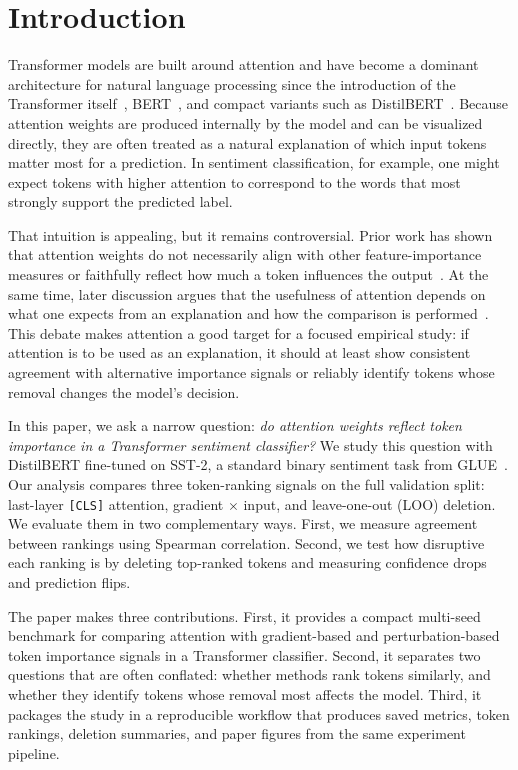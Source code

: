 \section{Introduction}
\label{sec:introduction}

Transformer models are built around attention and have become a dominant architecture for natural language processing since the introduction of the Transformer itself~\cite{vaswani2017attention}, BERT~\cite{devlin2019bert}, and compact variants such as DistilBERT~\cite{sanh2019distilbert}. Because attention weights are produced internally by the model and can be visualized directly, they are often treated as a natural explanation of which input tokens matter most for a prediction. In sentiment classification, for example, one might expect tokens with higher attention to correspond to the words that most strongly support the predicted label.

That intuition is appealing, but it remains controversial. Prior work has shown that attention weights do not necessarily align with other feature-importance measures or faithfully reflect how much a token influences the output~\cite{jain2019attention,serrano2019attention}. At the same time, later discussion argues that the usefulness of attention depends on what one expects from an explanation and how the comparison is performed~\cite{wiegreffe2019attention}. This debate makes attention a good target for a focused empirical study: if attention is to be used as an explanation, it should at least show consistent agreement with alternative importance signals or reliably identify tokens whose removal changes the model's decision.

In this paper, we ask a narrow question: \emph{do attention weights reflect token importance in a Transformer sentiment classifier?} We study this question with DistilBERT fine-tuned on SST-2, a standard binary sentiment task from GLUE~\cite{socher2013recursive,wang2018glue}. Our analysis compares three token-ranking signals on the full validation split: last-layer \texttt{[CLS]} attention, gradient $\times$ input, and leave-one-out (LOO) deletion. We evaluate them in two complementary ways. First, we measure agreement between rankings using Spearman correlation. Second, we test how disruptive each ranking is by deleting top-ranked tokens and measuring confidence drops and prediction flips.

The paper makes three contributions. First, it provides a compact multi-seed benchmark for comparing attention with gradient-based and perturbation-based token importance signals in a Transformer classifier. Second, it separates two questions that are often conflated: whether methods rank tokens similarly, and whether they identify tokens whose removal most affects the model. Third, it packages the study in a reproducible workflow that produces saved metrics, token rankings, deletion summaries, and paper figures from the same experiment pipeline.
